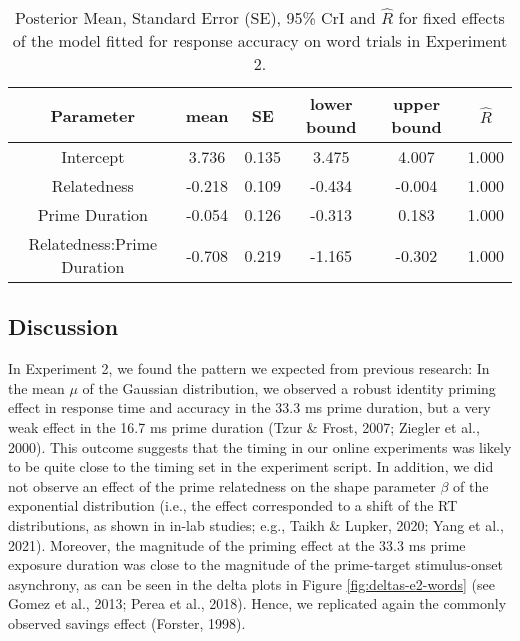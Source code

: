 \documentclass[
  english,
  man,floatsintext]{apa6}
\begin{document}
\begin{table}[H]

\begin{center}
\begin{threeparttable}

\caption{\label{tab:exp2-acc-blmm-table}Posterior Mean, Standard Error (SE), 95\% CrI and \(\hat{R}\) for fixed effects of the model fitted for response accuracy on word trials in Experiment 2.}

\small{

\begin{tabular}{cccccc}
\toprule
Parameter & \multicolumn{1}{c}{mean} & \multicolumn{1}{c}{SE} & \multicolumn{1}{c}{lower bound} & \multicolumn{1}{c}{upper bound} & \multicolumn{1}{c}{$\hat{R}$}\\
\midrule
Intercept & 3.736 & 0.135 & 3.475 & 4.007 & 1.000\\
Relatedness & -0.218 & 0.109 & -0.434 & -0.004 & 1.000\\
Prime Duration & -0.054 & 0.126 & -0.313 & 0.183 & 1.000\\
Relatedness:Prime Duration & -0.708 & 0.219 & -1.165 & -0.302 & 1.000\\
\bottomrule
\end{tabular}

}

\end{threeparttable}
\end{center}

\end{table}

\hypertarget{discussion-1}{%
\subsection{Discussion}\label{discussion-1}}

In Experiment 2, we found the pattern we expected from previous research: In the mean \(\mu\) of the Gaussian distribution, we observed a robust identity priming effect in response time and accuracy in the 33.3 ms prime duration, but a very weak effect in the 16.7 ms prime duration (Tzur \& Frost, 2007; Ziegler et al., 2000). This outcome suggests that the timing in our online experiments was likely to be quite close to the timing set in the experiment script. In addition, we did not observe an effect of the prime relatedness on the shape parameter \(\beta\) of the exponential distribution (i.e., the effect corresponded to a shift of the RT distributions, as shown in in-lab studies; e.g., Taikh \& Lupker, 2020; Yang et al., 2021). Moreover, the magnitude of the priming effect at the 33.3 ms prime exposure duration was close to the magnitude of the prime-target stimulus-onset asynchrony, as can be seen in the delta plots in Figure \ref{fig:deltas-e2-words} (see Gomez et al., 2013; Perea et al., 2018). Hence, we replicated again the commonly observed savings effect (Forster, 1998).
\end{document}
